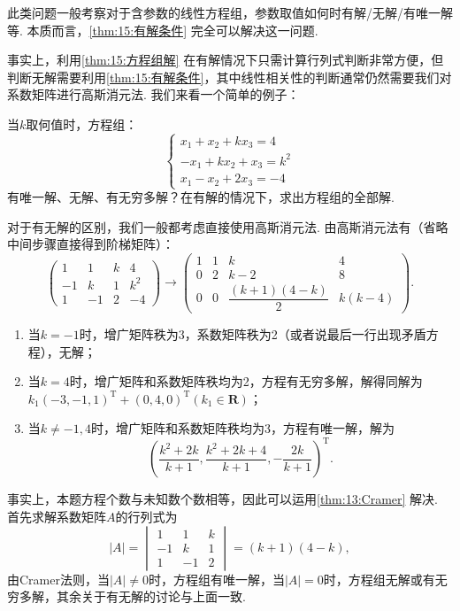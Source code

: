 此类问题一般考察对于含参数的线性方程组，参数取值如何时有解/无解/有唯一解等. 本质而言，\autoref{thm:15:有解条件} 完全可以解决这一问题.

事实上，利用\autoref{thm:15:方程组解} 在有解情况下只需计算行列式判断非常方便，但判断无解需要利用\autoref{thm:15:有解条件}，其中线性相关性的判断通常仍然需要我们对系数矩阵进行高斯消元法. 我们来看一个简单的例子：
\begin{example}
    当$k$取何值时，方程组：
    \[\begin{cases}
            x_1+x_2+kx_3=4 \\ -x_1+kx_2+x_3=k^2 \\ x_1-x_2+2x_3=-4
        \end{cases}\]
    有唯一解、无解、有无穷多解？在有解的情况下，求出方程组的全部解.
\end{example}
\begin{solution}
    对于有无解的区别，我们一般都考虑直接使用高斯消元法. 由高斯消元法有（省略中间步骤直接得到阶梯矩阵）：
    \[\begin{pmatrix}
            1  & 1  & k & 4   \\
            -1 & k  & 1 & k^2 \\
            1  & -1 & 2 & -4
        \end{pmatrix}\to\begin{pmatrix}
            1 & 1 & k                     & 4      \\
            0 & 2 & k-2                   & 8      \\
            0 & 0 & \dfrac{(k+1)(4-k)}{2} & k(k-4)
        \end{pmatrix}.\]
    \begin{enumerate}
        \item 当$k=-1$时，增广矩阵秩为3，系数矩阵秩为2（或者说最后一行出现矛盾方程），无解；

        \item 当$k=4$时，增广矩阵和系数矩阵秩均为2，方程有无穷多解，解得同解为$k_1(-3,-1,1)^{\mathrm{T}}+(0,4,0)^{\mathrm{T}}(k_1\in\mathbf{R})$；

        \item 当$k\neq-1,4$时，增广矩阵和系数矩阵秩均为3，方程有唯一解，解为
              \[(\dfrac{k^2+2k}{k+1},\dfrac{k^2+2k+4}{k+1},-\dfrac{2k}{k+1})^{\mathrm{T}}.\]
    \end{enumerate}

    事实上，本题方程个数与未知数个数相等，因此可以运用\autoref{thm:13:Cramer} 解决. 首先求解系数矩阵$A$的行列式为
    \[|A|=\begin{vmatrix}
            1  & 1  & k \\
            -1 & k  & 1 \\
            1  & -1 & 2
        \end{vmatrix}=(k+1)(4-k),\]
    由Cramer法则，当$|A|\neq 0$时，方程组有唯一解，当$|A|=0$时，方程组无解或有无穷多解，其余关于有无解的讨论与上面一致.
\end{solution}

